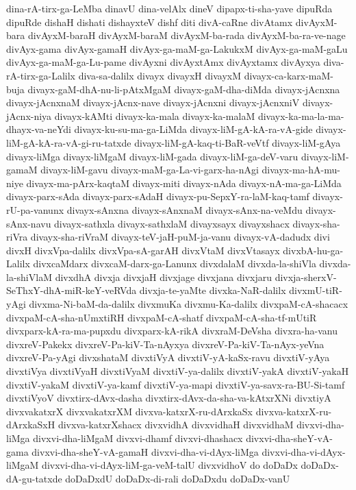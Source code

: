 {dina-rA-tirx-ga-LeMba
dinavU
dina-velAlx
dineV
dipapx-ti-sha-yave
dipuRda
dipuRde
dishaH
dishati
dishayxteV
dishf
diti
divA-caRne
divAtamx
divAyxM-bara
divAyxM-baraH
divAyxM-baraM
divAyxM-ba-rada
divAyxM-ba-ra-ve-nage
divAyx-gama
divAyx-gamaH
divAyx-ga-maM-ga-LakukxM
divAyx-ga-maM-gaLu
divAyx-ga-maM-ga-Lu-pame
divAyxni
divAyxtAmx
divAyxtamx
divAyxya
diva-rA-tirx-ga-Lalilx
diva-sa-dalilx
divayx
divayxH
divayxM
divayx-ca-karx-maM-buja
divayx-gaM-dhA-nu-li-pAtxMgaM
divayx-gaM-dha-diMda
divayx-jAcnxna
divayx-jAcnxnaM
divayx-jAcnx-nave
divayx-jAcnxni
divayx-jAcnxniV
divayx-jAcnx-niya
divayx-kAMti
divayx-ka-mala
divayx-ka-malaM
divayx-ka-ma-la-ma-dhayx-va-neYdi
divayx-ku-su-ma-ga-LiMda
divayx-liM-gA-kA-ra-vA-gide
divayx-liM-gA-kA-ra-vA-gi-ru-tatxde
divayx-liM-gA-kaq-ti-BaR-veVtf
divayx-liM-gAya
divayx-liMga
divayx-liMgaM
divayx-liM-gada
divayx-liM-ga-deV-varu
divayx-liM-gamaM
divayx-liM-gavu
divayx-maM-ga-La-vi-garx-ha-nAgi
divayx-ma-hA-mu-niye
divayx-ma-pArx-kaqtaM
divayx-miti
divayx-nAda
divayx-nA-ma-ga-LiMda
divayx-parx-sAda
divayx-parx-sAdaH
divayx-pu-SepxY-ra-laM-kaq-tamf
divayx-rU-pa-vanunx
divayx-sAnxna
divayx-sAnxnaM
divayx-sAnx-na-veMdu
divayx-sAnx-navu
divayx-sathxla
divayx-sathxlaM
divayxsayx
divayxshacx
divayx-sha-riVra
divayx-sha-riVraM
divayx-teV-jaH-puM-ja-vanu
divayx-vA-dadudx
divi
divxH
divxVpa-dalilx
divxVpa-sA-garAH
divxVtaM
divxVtasayx
divxbA-hu-ga-Lalilx
divxcaMdarx
divxcaM-darx-ga-Lanunx
divxdalaM
divxda-la-shiVla
divxda-la-shiVlaM
divxdhA
divxja
divxjaH
divxjage
divxjana
divxjaru
divxja-sherxV-SeThxY-dhA-miR-keY-veRVda
divxja-te-yaMte
divxka-NaR-dalilx
divxmU-tiR-yAgi
divxma-Ni-baM-da-dalilx
divxmuKa
divxmu-Ka-dalilx
divxpaM-cA-shacacx
divxpaM-cA-sha-nUmxtiRH
divxpaM-cA-shatf
divxpaM-cA-sha-tf-mUtiR
divxparx-kA-ra-ma-pupxdu
divxparx-kA-rikA
divxraM-DeVsha
divxra-ha-vanu
divxreV-Pakekx
divxreV-Pa-kiV-Ta-nAyxya
divxreV-Pa-kiV-Ta-nAyx-yeVna
divxreV-Pa-yAgi
divxshataM
divxtiVyA
divxtiV-yA-kaSx-ravu
divxtiV-yAya
divxtiVya
divxtiVyaH
divxtiVyaM
divxtiV-ya-dalilx
divxtiV-yakA
divxtiV-yakaH
divxtiV-yakaM
divxtiV-ya-kamf
divxtiV-ya-mapi
divxtiV-ya-savx-ra-BU-Si-tamf
divxtiVyoV
divxtirx-dAvx-dasha
divxtirx-dAvx-da-sha-va-kAtxrXNi
divxtiyA
divxvakatxrX
divxvakatxrXM
divxva-katxrX-ru-dArxkaSx
divxva-katxrX-ru-dArxkaSxH
divxva-katxrXshacx
divxvidhA
divxvidhaH
divxvidhaM
divxvi-dha-liMga
divxvi-dha-liMgaM
divxvi-dhamf
divxvi-dhashacx
divxvi-dha-sheY-vA-gama
divxvi-dha-sheY-vA-gamaH
divxvi-dha-vi-dAyx-liMga
divxvi-dha-vi-dAyx-liMgaM
divxvi-dha-vi-dAyx-liM-ga-veM-talU
divxvidhoV
do
doDaDx
doDaDx-dA-gu-tatxde
doDaDxdU
doDaDx-di-rali
doDaDxdu
doDaDx-vanU
}
